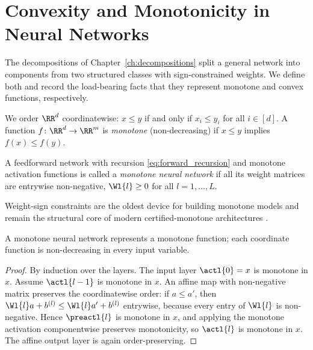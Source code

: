 \section{Convexity and Monotonicity in Neural Networks}\label{sec:convex_monotone_foundations}

The decompositions of Chapter~\ref{ch:decompositions} split a general network into components from two structured classes with sign-constrained weights. We define both and record the load-bearing facts that they represent monotone and convex functions, respectively.

We order $\RR^d$ coordinatewise: $x \le y$ if and only if $x_i \le y_i$ for all $i \in [d]$. A function $f \colon \RR^d \to \RR^m$ is \emph{monotone} (non-decreasing) if $x \le y$ implies $f(x) \le f(y)$.

\begin{definition}\label{def:monotone_network}
A feedforward network with recursion \eqref{eq:forward_recursion} and monotone activation functions is called a \emph{monotone neural network} if all its weight matrices are entrywise non-negative, $\Wl{l} \ge 0$ for all $l = 1, \ldots, L$.
\end{definition}

Weight-sign constraints are the oldest device for building monotone models \parencite{Sill1997_MonotonicNetworks,Daniels2010_MonotoneNN} and remain the structural core of modern certified-monotone architectures \parencite{Liu2020CertifiedMonotone,Runje_2023}.

\begin{proposition}\label{prop:monotone_represents}
A monotone neural network represents a monotone function; each coordinate function is non-decreasing in every input variable.
\hfill{}
\end{proposition}

\begin{proof}
By induction over the layers. The input layer $\actl{0} = x$ is monotone in $x$. Assume $\actl{l-1}$ is monotone in $x$. An affine map with non-negative matrix preserves the coordinatewise order: if $a \le a'$, then $\Wl{l} a + b^{(l)} \le \Wl{l} a' + b^{(l)}$ entrywise, because every entry of $\Wl{l}$ is non-negative. Hence $\preactl{l}$ is monotone in $x$, and applying the monotone activation componentwise preserves monotonicity, so $\actl{l}$ is monotone in $x$. The affine output layer is again order-preserving.
\end{proof}

